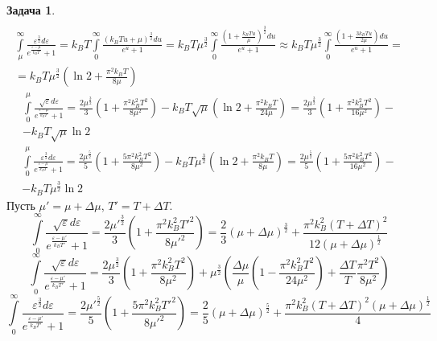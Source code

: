 \documentclass[12pt]{article}
\theoremstyle{definition}
\newtheorem{zad}{Задача}[section]
\begin{document}
\begin{zad}
\begin{multline}
\end{multline}
\begin{multline}
    \int\limits_\mu^\infty\frac{\varepsilon^{\frac{3}{2}}d\varepsilon}{e^{\frac{\varepsilon-\mu}{k_BT}}+1}=k_BT\int\limits_0^\infty\frac{(k_BTu+\mu)^\frac{3}{2}du}{e^u+1}=k_BT\mu^\frac{3}{2}\int\limits_0^\infty\frac{(1+\frac{k_BTu}{\mu})^\frac{3}{2}du}{e^u+1}\approx k_BT\mu^\frac{3}{2}\int\limits_0^\infty\frac{\left(1+\frac{3k_BTu}{2\mu}\right)du}{e^u+1}=\\=k_BT\mu^\frac{3}{2}\left(\ln2+\frac{\pi^2k_BT}{8\mu}\right)
\end{multline}
\begin{multline}
     \int\limits_0^\mu\frac{\sqrt{\varepsilon}d\varepsilon}{e^{\frac{\varepsilon-\mu}{k_BT}}+1}=\frac{2\mu^\frac{3}{2}}{3}\left(1+\frac{\pi^2k_B^2T^2}{8\mu^2}\right)-k_BT\sqrt{\mu}\left(\ln2+\frac{\pi^2k_BT}{24\mu}\right)=\frac{2\mu^\frac{3}{2}}{3}\left(1+\frac{\pi^2k_B^2T^2}{16\mu^2}\right)-\\-k_BT\sqrt{\mu}\ln2
\end{multline}
\begin{multline}
     \int\limits_0^\mu\frac{\varepsilon^{\frac{3}{2}}d\varepsilon}{e^{\frac{\varepsilon-\mu}{k_BT}}+1}=\frac{2\mu^\frac{5}{2}}{5}\left(1+\frac{5\pi^2k_B^2T^2}{8\mu^2}\right)-k_BT\mu^\frac{3}{2}\left(\ln2+\frac{\pi^2k_BT}{8\mu}\right)=\frac{2\mu^\frac{5}{2}}{5}\left(1+\frac{5\pi^2k_B^2T^2}{16\mu^2}\right)-\\-k_BT\mu^\frac{3}{2}\ln2
\end{multline}
Пусть $\mu'=\mu+\Delta\mu$, $T'=T+\Delta T$.
\begin{equation}
    \int\limits_0^\infty\frac{\sqrt{\varepsilon}d\varepsilon}{e^{\frac{\varepsilon-\mu'}{k_BT'}}+1}=\frac{2\mu'^{\frac{3}{2}}}{3}\left(1+\frac{\pi^2k_B^2T'^2}{8\mu'^2}\right)=\frac{2}{3}(\mu+\Delta\mu)^\frac{3}{2}+\frac{\pi^2k_B^2(T+\Delta T)^2}{12(\mu+\Delta\mu)^{\frac{1}{2}}}
\end{equation}
\begin{equation}
    \int\limits_0^\infty\frac{\sqrt{\varepsilon}d\varepsilon}{e^{\frac{\varepsilon-\mu'}{k_BT'}}+1}=\frac{2\mu^{\frac{3}{2}}}{3}\left(1+\frac{\pi^2k_B^2T^2}{8\mu^2}\right)+\mu^\frac{3}{2}\left(\frac{\Delta\mu}{\mu}\left(1-\frac{\pi^2k_B^2T^2}{24\mu^2}\right)+\frac{\Delta T}{T}\frac{\pi^2T^2}{8\mu^2}\right)
\end{equation}
\begin{equation}
    \int\limits_0^\infty\frac{\varepsilon^{\frac{3}{2}}d\varepsilon}{e^{\frac{\varepsilon-\mu'}{k_BT'}}+1}=\frac{2\mu'^{\frac{5}{2}}}{5}\left(1+\frac{5\pi^2k_B^2T'^2}{8\mu'^2}\right)=\frac{2}{5}(\mu+\Delta\mu)^\frac{5}{2}+\frac{\pi^2k_B^2(T+\Delta T)^2(\mu+\Delta\mu)^\frac{1}{2}}{4}

\end{equation}
\end{zad}
\end{document}
